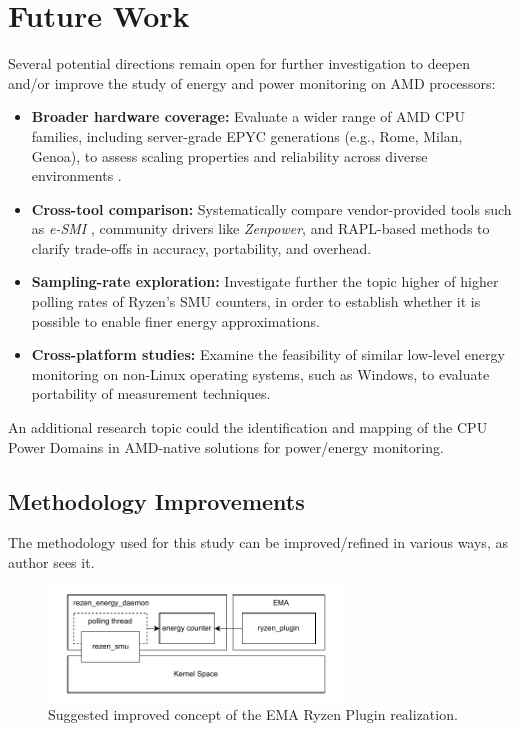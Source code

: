 \section{Future Work}

Several potential directions remain open for further investigation to
deepen and/or improve the study of energy and power monitoring on
AMD processors:

\begin{itemize}
  \item \textbf{Broader hardware coverage:} Evaluate a wider range of AMD
        \gls{CPU} families, including server-grade EPYC generations
        (e.g., Rome, Milan, Genoa), to assess scaling properties and reliability across diverse environments \parencite{hackenberg2019epyc}.
  \item \textbf{Cross-tool comparison:} Systematically compare vendor-provided
        tools such as \textit{e-SMI} \parencite{amd2022esmi}, community
        drivers like \textit{Zenpower}, and \gls{RAPL}-based methods to
        clarify trade-offs in accuracy, portability, and overhead.
  \item \textbf{Sampling-rate exploration:} Investigate further the topic
        higher of higher polling rates of Ryzen’s \gls{SMU} counters, in order
        to establish whether it is possible to enable finer energy
        approximations.
  \item \textbf{Cross-platform studies:} Examine the feasibility of similar
        low-level energy monitoring on non-Linux operating systems, such as
        Windows, to evaluate portability of measurement techniques.
\end{itemize}

An additional research topic could the identification and mapping of the
\gls{CPU} Power Domains in AMD-native solutions for power/energy monitoring. 

\subsection{Methodology Improvements}

The methodology used for this study can be improved/refined in various ways,
as author sees it.

\begin{figure}[h]
    \centering
    \includegraphics[width=0.7\textwidth]{assets/methodology_improved_concept}
    \caption{
      Suggested improved concept of the \gls{EMA} Ryzen Plugin realization.
    }
    \label{fig:method}
\end{figure}

